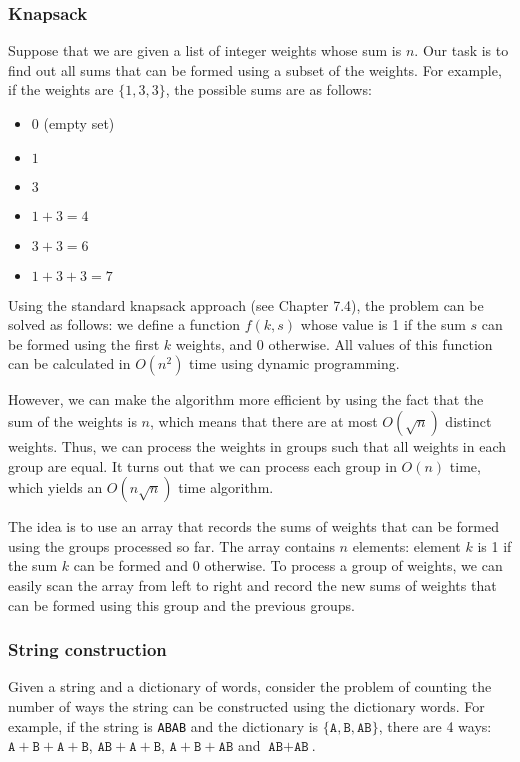 \subsubsection{Knapsack}

Suppose that we are given a list of integer weights
whose sum is $n$.
Our task is to find out all sums that can be formed using
a subset of the weights. For example, if the weights are
$\{1,3,3\}$, the possible sums are as follows:

\begin{itemize}[noitemsep]
\item $0$ (empty set)
\item $1$
\item $3$
\item $1+3=4$
\item $3+3=6$
\item $1+3+3=7$
\end{itemize}

Using the standard knapsack approach (see Chapter 7.4),
the problem can be solved as follows:
we define a function $f(k,s)$ whose value is 1
if the sum $s$ can be formed using the first $k$ weights,
and 0 otherwise.
All values of this function can be calculated
in $O(n^2)$ time using dynamic programming.

However, we can make the algorithm more efficient
by using the fact that the sum of the weights is $n$,
which means that there are at most $O(\sqrt n)$
distinct weights.
Thus, we can process the weights in groups
such that all weights in each group are equal.
It turns out that we can process each group
in $O(n)$ time, which yields an $O(n \sqrt n)$ time algorithm.

The idea is to use an array that records the sums of weights
that can be formed using the groups processed so far.
The array contains $n$ elements: element $k$ is 1 if the sum
$k$ can be formed and 0 otherwise.
To process a group of weights, we can easily scan the array
from left to right and record the new sums of weights that
can be formed using this group and the previous groups.

\subsubsection{String construction}

Given a string and a dictionary of words,
consider the problem of counting the number of ways
the string can be constructed using the dictionary words.
For example,
if the string is \texttt{ABAB} and the dictionary is
$\{\texttt{A},\texttt{B},\texttt{AB}\}$,
there are 4 ways:
$\texttt{A}+\texttt{B}+\texttt{A}+\texttt{B}$,
$\texttt{AB}+\texttt{A}+\texttt{B}$,
$\texttt{A}+\texttt{B}+\texttt{AB}$ and
$\texttt{AB}+\texttt{AB}$.

